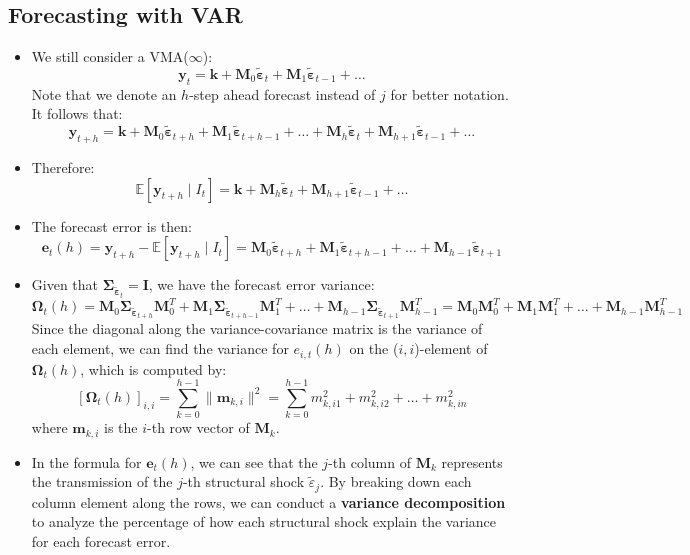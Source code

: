 \documentclass[notitlepage]{article}
\begin{document}
\subsection{Forecasting with VAR}

\begin{itemize}
    \item We still consider a VMA(\(\infty\)):
    \[
    \mathbf{y}_t = \mathbf{k} + \mathbf{M}_0 \tilde{\boldsymbol{\varepsilon}}_t + \mathbf{M}_1 \tilde{\boldsymbol{\varepsilon}}_{t-1} + \dots
    \]
    Note that we denote an \(h\)-step ahead forecast instead of \(j\) for better notation. It follows that:
    \[
    \mathbf{y}_{t+h} = \mathbf{k} + \mathbf{M}_0 \tilde{\boldsymbol{\varepsilon}}_{t+h} + \mathbf{M}_1 \tilde{\boldsymbol{\varepsilon}}_{t+h-1} + \dots + \mathbf{M}_h \tilde{\boldsymbol{\varepsilon}}_{t} + \mathbf{M}_{h+1} \tilde{\boldsymbol{\varepsilon}}_{t-1} + \dots
    \]
    \item Therefore:
    \[
    \mathbb{E}[\mathbf{y}_{t+h} \mid I_{t}] = \mathbf{k} + \mathbf{M}_h \tilde{\boldsymbol{\varepsilon}}_{t} + \mathbf{M}_{h+1} \tilde{\boldsymbol{\varepsilon}}_{t-1} + \dots
    \]
    \item The forecast error is then:
    \[
    \mathbf{e}_t(h) = \mathbf{y}_{t+h} - \mathbb{E}[\mathbf{y}_{t+h} \mid I_{t}] = \mathbf{M}_0 \tilde{\boldsymbol{\varepsilon}}_{t+h} + \mathbf{M}_1 \tilde{\boldsymbol{\varepsilon}}_{t+h-1} + \dots + \mathbf{M}_{h-1} \tilde{\boldsymbol{\varepsilon}}_{t+1}
    \]
    \item Given that \(\boldsymbol{\Sigma}_{\tilde{\boldsymbol{\varepsilon}}_t} = \mathbf{I}\), we have the forecast error variance:
    \[
    \boldsymbol{\Omega}_t(h) = \mathbf{M}_0 \boldsymbol{\Sigma}_{\tilde{\boldsymbol{\varepsilon}}_{t+h}} \mathbf{M}_0^T + \mathbf{M}_1 \boldsymbol{\Sigma}_{\tilde{\boldsymbol{\varepsilon}}_{t+h-1}} \mathbf{M}_1^T  + \dots + \mathbf{M}_{h-1} \boldsymbol{\Sigma}_{\tilde{\boldsymbol{\varepsilon}}_{t+1}} \mathbf{M}_{h-1}^T = \mathbf{M}_0 \mathbf{M}_0^T + \mathbf{M}_1 \mathbf{M}_1^T  + \dots + \mathbf{M}_{h-1} \mathbf{M}_{h-1}^T
    \]
    Since the diagonal along the variance-covariance matrix is the variance of each element, we can find the variance for \(e_{i,t}(h)\) on the (\(i,i\))-element of \(\boldsymbol{\Omega}_t(h)\), which is computed by:
    \[
    [\boldsymbol{\Omega}_t(h)]_{i,i} = \sum_{k=0}^{h-1} \| \mathbf{m}_{k,i} \|^2 = \sum_{k=0}^{h-1} m_{k,i1}^2 + m_{k,i2}^2 + \dots + m_{k,in}^2
    \]
    where \(\mathbf{m}_{k,i}\) is the \(i\)-th row vector of \(\mathbf{M}_{k}\). 
    \item In the formula for \(\mathbf{e}_t(h)\), we can see that the $j$-th column of $\mathbf{M}_k$ represents the transmission of the $j$-th structural shock $\tilde{\varepsilon}_{j}$. By breaking down each column element along the rows, we can conduct a \textbf{variance decomposition} to analyze the percentage of how each structural shock explain the variance for each forecast error.

\end{itemize}
\end{document}
